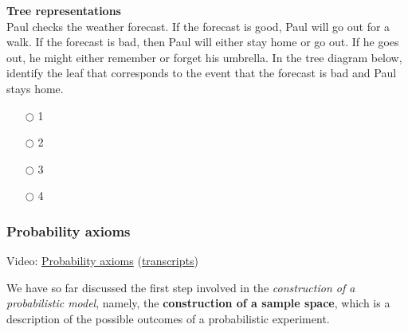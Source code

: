 \documentclass[pdftex, brazil, 12pt, twoside]{article}
\begin{document}
\begin{exercise}
  \textbf{Tree representations}\\
  Paul checks the weather forecast. If the forecast is good, Paul will go out for
  a walk. If the forecast is bad, then Paul will either stay home or go out. If
  he goes out, he might either remember or forget his umbrella. In the tree diagram
  below, identify the leaf that corresponds to the event that the forecast is bad
  and Paul stays home.

  \begin{figure}[H]
    \begin{center}
    \end{center}
  \end{figure}

  \begin{itemize}[noitemsep]
  \item[$\bigcirc$] 1
  \item[$\bigcirc$] 2
  \item[$\bigcirc$] 3
  \item[$\bigcirc$] 4
  \end{itemize}
\end{exercise}

\subsubsection{Probability axioms}
\label{un1-lec1-prob-axioms}

Video: \href{https://www.youtube.com/watch?v=2J5Vr-kB\_c4}{Probability axioms}
(\href{Unit-1/01\_lecture\_1\_probability\_models\_and\_axioms/l01\_3\_transcripts.pdf}{transcripts})

We have so far discussed the first step involved in the \emph{construction of a
probabilistic model}, namely, the \textbf{construction of a sample space}, which
is a description of the possible outcomes of a probabilistic experiment.
\end{document}
